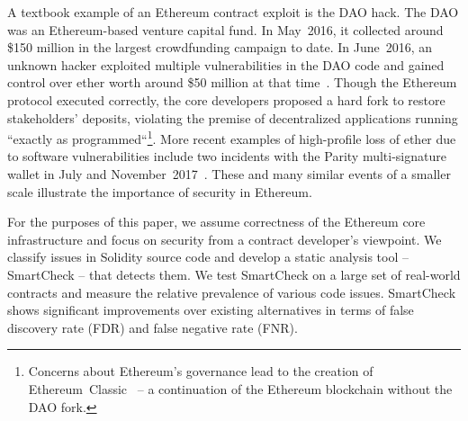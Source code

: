 A textbook example of an Ethereum contract exploit is the DAO hack.
The DAO was an Ethereum-based venture capital fund.
In May~2016, it collected around \$150 million in the largest crowdfunding campaign to date.
In June~2016, an unknown hacker exploited multiple vulnerabilities in the DAO code and gained control over ether worth around \$50 million at that time~\cite{Sirer2016}.
Though the Ethereum protocol executed correctly, the core developers proposed a hard fork to restore stakeholders' deposits, violating the premise of decentralized applications running ``exactly as programmed``\footnote{Concerns about Ethereum's governance lead to the creation of Ethereum~Classic~\cite{EthereumClassic} -- a continuation of the Ethereum blockchain without the DAO fork.}.
More recent examples of high-profile loss of ether due to software vulnerabilities include two incidents with the Parity multi-signature wallet in July and November~2017~\cite{Palladino2017}.
These and many similar events of a smaller scale illustrate the importance of security in Ethereum.

For the purposes of this paper, we assume correctness of the Ethereum core infrastructure and focus on security from a contract developer's viewpoint.
We classify issues in Solidity source code and develop a static analysis tool -- SmartCheck -- that detects them.
We test SmartCheck on a large set of real-world contracts and measure the relative prevalence of various code issues.
SmartCheck shows significant improvements over existing alternatives in terms of false discovery rate (FDR) and false negative rate (FNR).